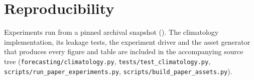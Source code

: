 \documentclass[conference]{IEEEtran}
\begin{document}


\section*{Reproducibility}
Experiments run from a pinned archival snapshot (\AsOf{}). The climatology
implementation, its leakage tests, the experiment driver and the asset
generator that produces every figure and table are included in the
accompanying source tree (\texttt{forecasting/climatology.py},
\texttt{tests/test\_climatology.py},
\texttt{scripts/run\_paper\_experiments.py},
\texttt{scripts/build\_paper\_assets.py}).



\end{document}
